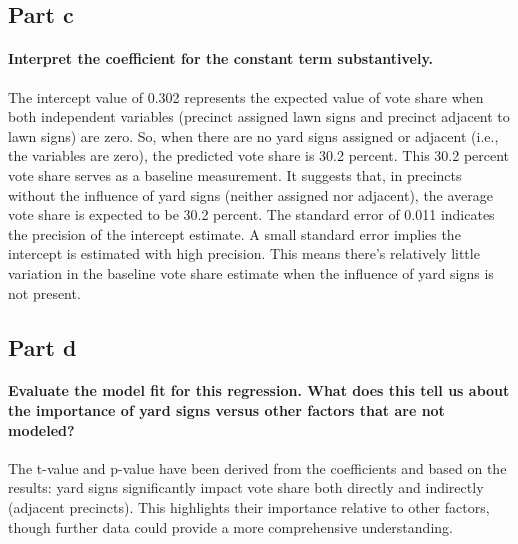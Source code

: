 \documentclass{article}
\begin{document}
	\subsection{Part c}
	\paragraph{Interpret the coefficient for the constant term substantively.}
	The intercept value of 0.302 represents the expected value of vote share when both independent variables (precinct assigned lawn signs and precinct adjacent to lawn signs) are zero. So, when there are no yard signs assigned or adjacent (i.e., the variables are zero), the predicted vote share is 30.2 percent.
	This 30.2 percent vote share serves as a baseline measurement. It suggests that, in precincts without the influence of yard signs (neither assigned nor adjacent), the average vote share is expected to be 30.2 percent.
	The standard error of 0.011 indicates the precision of the intercept estimate. A small standard error implies the intercept is estimated with high precision.
	This means there's relatively little variation in the baseline vote share estimate when the influence of yard signs is not present.
	\subsection{Part d}
	\paragraph{Evaluate the model fit for this regression. What does this tell us about the importance of yard signs versus other factors that are not modeled?} The t-value and p-value have been derived from the coefficients and based on the results: yard signs significantly impact vote share both directly and indirectly (adjacent precincts). This highlights their importance relative to other factors, though further data could provide a more comprehensive understanding.
\end{document}
